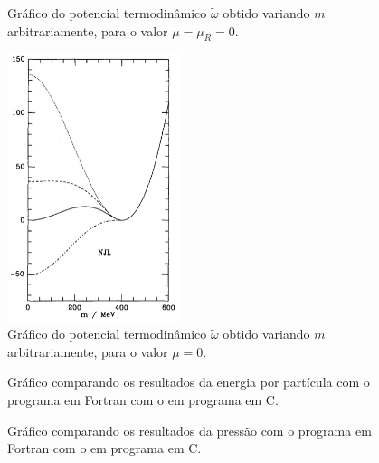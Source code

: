 
\begin{figure}
	
	\caption{Gráfico do potencial termodinâmico $\tilde{\omega}$ obtido variando $m$ arbitrariamente, para o valor $\mu = \mu_R = 0$. \protect}
	\label{Fig:pot_term_analysys_NJL-Buballa_Set_1}
\end{figure}

\begin{figure}
	\centering
	\includegraphics[width=0.45\textwidth]{graphics/Therm_pot_analysis/Pot_buballa.png}
	\caption{Gráfico do potencial termodinâmico $\tilde{\omega}$ obtido variando $m$ arbitrariamente, para o valor $\mu = 0$.}
	\label{Fig:pot_term_analysys_Buballa_NJL-Buballa_Set_1}
\end{figure}

\begin{figure}
	
	\caption{Gráfico comparando os resultados da energia por partícula com o programa em Fortran com o em programa em C. \protect}
	\label{Fig:energy_Comp_C_F}
\end{figure}

\begin{figure}
	
	\caption{Gráfico comparando os resultados da pressão com o programa em Fortran com o em programa em C. \protect}
	\label{Fig:pressure_Comp_C_F}
\end{figure}

\FloatBarrier

